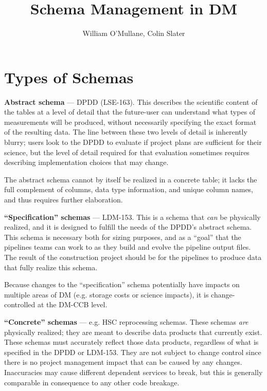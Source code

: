 \documentclass[DM,authoryear,toc]{lsstdoc}
\title{Schema Management in DM}
\author{%
William O'Mullane,
Colin Slater
}
\date{\vcsDate}
\begin{document}
\maketitle


\section{Types of Schemas}

\textbf{Abstract schema} --- DPDD (LSE-163). This describes the scientific content of the tables at a
level of detail that the future-user can understand what types of measurements will be produced,
without necessarily specifying the exact format of the resulting data. The line between these two
levels of detail is inherently blurry; users look to the DPDD to evaluate if project plans are
sufficient for their science, but the level of detail required for that evaluation sometimes
requires describing implementation choices that may change.

The abstract schema cannot by itself be realized in a concrete table; it lacks the full complement
of columns, data type information, and unique column names, and thus requires further elaboration.

\textbf{``Specification'' schemas} --- LDM-153. This is a schema that \textit{can} be physically
realized, and it is designed to fulfill the needs of the DPDD's abstract schema. This schema is
necessary both for sizing purposes, and as a ``goal'' that the pipelines teams can work to as they
build and evolve the pipeline output files. The result of the construction project should be for the
pipelines to produce data that fully realize this schema.

Because changes to the ``specification'' schema potentially have impacts on multiple areas of DM (e.g.
storage costs or science impacts), it is change-controlled at the DM-CCB level.


\textbf{``Concrete'' schemas} --- e.g. HSC reprocessing schemas. These schemas \textit{are}
physically realized; they are meant to describe data products that currently exist. These schemas
must accurately reflect those data products, regardless of what is specified in the DPDD or LDM-153.
They are not subject to change control since there is no project management impact that can be
caused by any changes. Inaccuracies may cause different dependent services to break, but this is
generally comparable in consequence to any other code breakage.
\end{document}

